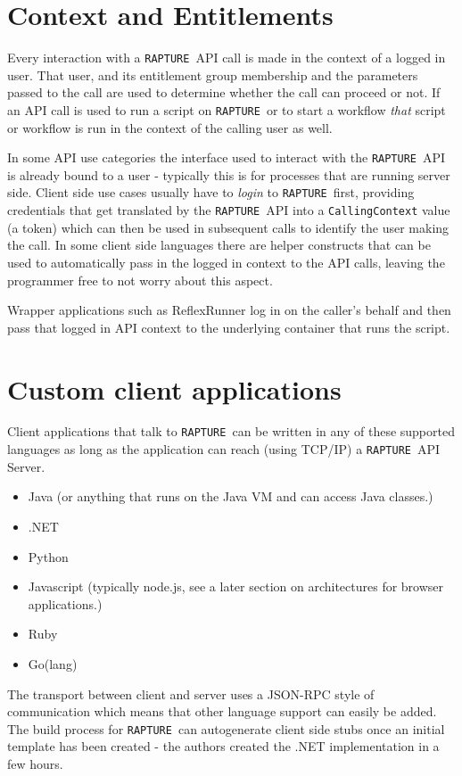 \documentclass[12pt,twoside,a4paper]{book}
\newcommand{\Rapture}{\Verb+RAPTURE+~}
\begin{document}
\section{Context and Entitlements}
Every interaction with a \Rapture API call is made in the context of a logged in
user. That user, and its entitlement group membership and the parameters passed
to the call are used to determine whether the call can proceed or not. If an
API call is used to run a script on \Rapture or to start a workflow \emph{that} script
or workflow is run in the context of the calling user as well.

In some API use categories the interface used to interact with the \Rapture API
is already bound to a user - typically this is for processes that are running
server side. Client side use cases usually have to \emph{login} to \Rapture first,
providing credentials that get translated by the \Rapture API into a \verb+CallingContext+
value (a token) which can then be used in subsequent calls to identify the user
making the call. In some client side languages there are helper constructs that
can be used to automatically pass in the logged in context to the API calls,
leaving the programmer free to not worry about this aspect.

Wrapper applications such as ReflexRunner log in on the caller's behalf and then
pass that logged in API context to the underlying container that runs the script.

\section{Custom client applications}

Client applications that talk to \Rapture can be written in any of these supported languages as
long as the application can reach (using TCP/IP) a \Rapture API Server.

\begin{itemize}
  \item{Java (or anything that runs on the Java VM and can access Java classes.)}
  \item{.NET}
  \item{Python}
  \item{Javascript (typically node.js, see a later section on architectures for browser applications.)}
  \item{Ruby}
  \item{Go(lang)}
\end{itemize}

The transport between client and server uses a JSON-RPC style of communication which
means that other language support can easily be added. The build process for
\Rapture can autogenerate client side stubs once an initial template has been
created - the authors created the .NET implementation in a few hours.
\end{document}
